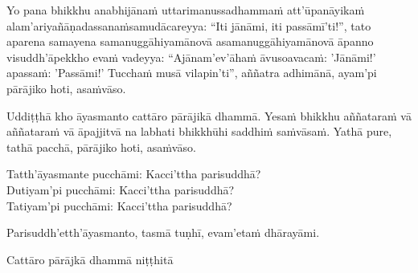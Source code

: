 Yo pana bhikkhu anabhijānaṁ uttarimanussadhammaṁ att'ūpanāyikaṁ alam'ariyañāṇadassanaṁ\makeatletter\hyperlink{endnote33-appendix}\makeatother \thinspace samudācareyya: ``Iti jānāmi, iti passāmī'ti!'', tato aparena samayena samanuggāhiyamāno\makeatletter\hyperlink{endnote34-appendix}\makeatother \thinspace  vā asamanuggāhiyamāno\makeatletter\hyperlink{endnote35-appendix}\makeatother \thinspace  vā āpanno visuddh'āpekkho evaṁ vadeyya: ``Ajānam'ev'āhaṁ āvuso\makeatletter\hyperlink{endnote36-appendix}\makeatother \thinspace  avacaṁ: 'Jānāmi!' apassaṁ: 'Passāmi!' Tucchaṁ musā vilapin'ti'', aññatra adhimānā, ayam'pi pārājiko hoti, asaṁvāso.



\ifafiveversion \clearpage \else \medskip \fi

\begin{center}
	Uddiṭṭhā kho āyasmanto cattāro pārājikā dhammā. Yesaṁ bhikkhu aññataraṁ vā aññataraṁ vā āpajjitvā na labhati bhikkhūhi saddhiṁ saṁvāsaṁ. Yathā pure, tathā pacchā, pārājiko hoti, asaṁvāso.

	\smallskip

	Tatth'āyasmante pucchāmi: Kacci'ttha parisuddhā?\\
	Dutiyam'pi pucchāmi: Kacci'ttha parisuddhā?\\
	Tatiyam'pi pucchāmi: Kacci'ttha parisuddhā?

	\smallskip

	Parisuddh'etth'āyasmanto, tasmā tuṇhī, evam'etaṁ dhārayāmi.
\end{center}

\begin{outro}
	Cattāro pārājkā dhammā niṭṭhitā\makeatletter\hyperlink{endnote10-appendix}\makeatother \thinspace\makeatletter\hyperlink{endnote37-appendix}\makeatother \thinspace
\end{outro}

\clearpage

